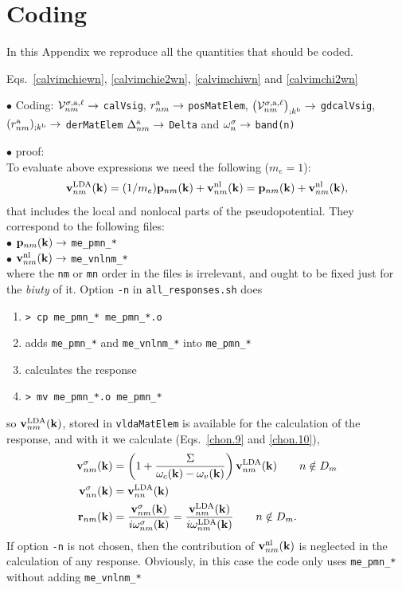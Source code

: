 \section{Coding}\label{code}
In this Appendix we reproduce all the quantities  that should be coded.

Eqs.~\eqref{calvimchiewn}, \eqref{calvimchie2wn}, \eqref{calvimchiwn}
 and \eqref{calvimchi2wn}

\noindent$\bullet$ Coding:
${\mathbf{\cal V}}^{\sigma,\mathrm{a},\ell}_{nm}\to$ \verb=calVsig=,
$r^{\mathrm{a}}_{nm}\to$ \verb=posMatElem=,
$\left({\mathbf{\cal V}}^{\sigma,\mathrm{a},\ell}_{nm}\right)_{;k^{\mathrm{b}}}\to$ \verb=gdcalVsig=,
\\ $(r^{\mathrm{a}}_{nm})_{;k^{\mathrm{b}}}\to$ \verb=derMatElem= 
$\Delta^{\mathrm{a}}_{nm}\to$ \verb=Delta= and $\omega^\sigma_n\to$ \verb=band(n)=

$\bullet$ proof:\\
To evaluate above expressions we need the following ($m_e=1$):
\begin{align}\label{}
\mathbf{v}^{\mathrm{LDA}}_{nm}(\mathbf{k}) 
=(1/m_e)\mathbf{p}_{nm}(\mathbf{k})+\mathbf{v}^{\mathrm{nl}}_{nm}(\mathbf{k})
=\mathbf{p}_{nm}(\mathbf{k})+\mathbf{v}^{\mathrm{nl}}_{nm}(\mathbf{k})
,
\end{align}
that
 includes the local and nonlocal parts of the pseudopotential. They
 correspond to the following files:\\
$\bullet$ $\mathbf{p}_{nm}(\mathbf{k})\to$ \verb=me_pmn_*=\\
$\bullet$ $\mathbf{v}^{\mathrm{nl}}_{nm}(\mathbf{k})\to$ \verb=me_vnlnm_*=\\
where the \verb=nm= or \verb=mn= order in the files is irrelevant, and
ought to be fixed just for the {\it biuty} of it.
Option \verb=-n= in \verb=all_responses.sh= does
\begin{enumerate}
\item 
 \verb=> cp me_pmn_* me_pmn_*.o= 
\item adds \verb=me_pmn_*= and \verb=me_vnlnm_*= into
  \verb=me_pmn_*= 
\item calculates the response
\item \verb=> mv me_pmn_*.o me_pmn_*=
\end{enumerate}
so   
$\mathbf{v}^{\mathrm{LDA}}_{nm}(\mathbf{k})$, stored in \verb=vldaMatElem=
is available for the calculation of the response, and with it we calculate
(Eqs.~\eqref{chon.9} and \eqref{chon.10}),
\begin{align}\label{c-chon.98}
\mathbf{v}^\sigma_{nm}(\mathbf{k})
&=
\left(1+\frac{\Sigma}{\omega_c(\mathbf{k})-\omega_v(\mathbf{k})}\right)\mathbf{v}^{\mathrm{LDA}}_{nm}(\mathbf{k})
\quad\quad n\notin D_m
\nonumber\\
\mathbf{v}^\sigma_{nn}(\mathbf{k})
&=
\mathbf{v}^{\mathrm{LDA}}_{nn}(\mathbf{k})
\nonumber\\
\mathbf{r}_{nm}(\mathbf{k})&=\frac{\mathbf{v}^\sigma_{nm}(\mathbf{k})}{i\omega^\sigma_{nm}(\mathbf{k})}
=\frac{\mathbf{v}^{\mathrm{LDA}}_{nm}(\mathbf{k})}{i\omega^{\mathrm{LDA}}_{nm}(\mathbf{k})}
\quad\quad n\notin D_m
.
\end{align}   
If option \verb=-n= is not chosen, then the contribution of $\mathbf{v}^{\mathrm{nl}}_{nm}(\mathbf{k})$
is neglected in the calculation of any response. Obviously, in this
case the code only uses \verb=me_pmn_*= without adding \verb=me_vnlnm_*= 

